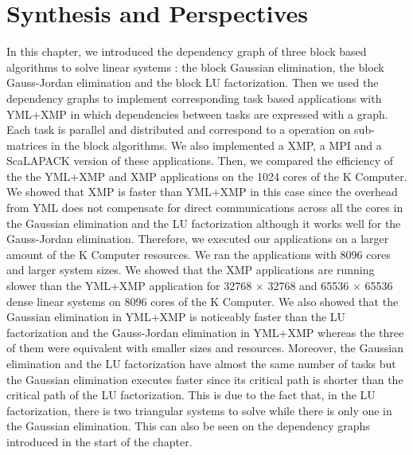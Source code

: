 \section{Synthesis and Perspectives}
In this chapter, we introduced the dependency graph of three block based algorithms to solve linear systems : the block Gaussian elimination, the block Gauss-Jordan elimination and the block LU factorization.
Then we used the dependency graphs to implement corresponding task based applications with YML+XMP in which dependencies between tasks are expressed with a graph.
Each task is parallel and distributed and correspond to a operation on sub-matrices in the block algorithms.
We also implemented a XMP, a MPI and a ScaLAPACK version of these applications.
Then, we compared the efficiency of the the YML+XMP and XMP applications on the 1024 cores of the K Computer.
We showed that XMP is faster than YML+XMP in this case since the overhead from YML does not compensate for direct communications across all the cores in the Gaussian elimination and the LU factorization although it works well for the Gauss-Jordan elimination.
Therefore, we executed our applications on a larger amount of the K Computer resources.
We ran the applications with 8096 cores and larger system sizes.
We showed that the XMP applications are running slower than the YML+XMP application for 32768 $\times$ 32768 and 65536 $\times$ 65536 dense linear systems on 8096 cores of the K Computer.
We also showed that the Gaussian elimination in YML+XMP is noticeably faster than the LU factorization and the Gauss-Jordan elimination in YML+XMP whereas the three of them were equivalent with smaller sizes and resources.
Moreover, the Gaussian elimination and the LU factorization have almost the same number of tasks but the Gaussian elimination executes faster since its critical path is shorter than the critical path of the LU factorization.
This is due to the fact that, in the LU factorization, there is two triangular systems to solve while there is only one in the Gaussian elimination.
This can also be seen on the dependency graphs introduced in the start of the chapter.


